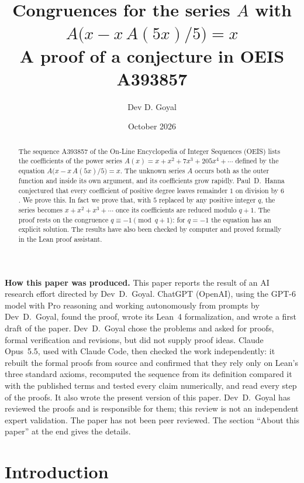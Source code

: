\documentclass[11pt,a4paper]{article}
\title{Congruences for the series $A$ with $A\bigl(x-x\,A(5x)/5\bigr)=x$\\[6pt]\large A proof of a conjecture in OEIS A393857}
\author{Dev D. Goyal}
\date{October 2026}
\theoremstyle{definition}
\theoremstyle{remark}
\begin{document}
\maketitle
\begin{abstract}
The sequence A393857 of the On-Line Encyclopedia of Integer Sequences (OEIS) lists the coefficients of the power
series $A(x)=x+x^2+7x^3+205x^4+\cdots$ defined by the equation
$A\bigl(x-x\,A(5x)/5\bigr)=x$. The unknown series $A$ occurs both as the outer function and inside its own argument, and its coefficients grow rapidly.
Paul~D.~Hanna conjectured that every coefficient of positive degree leaves remainder $1$ on division by $6$. We prove this. In fact we prove that, with $5$ replaced by any positive integer $q$, the series becomes $x+x^2+x^3+\cdots$ once its coefficients are reduced modulo $q+1$. The proof rests on the congruence $q\equiv-1\pmod{q+1}$: for $q=-1$ the equation
has an explicit solution. The results have also been checked by computer and proved formally in the
Lean proof assistant.
\end{abstract}
\begin{center}\begin{minipage}{0.88\linewidth}\small
\textbf{How this paper was produced.} This paper reports the result of an AI research effort directed by
Dev~D.~Goyal. ChatGPT (OpenAI), using the GPT-6 model with Pro reasoning and working autonomously from prompts by
Dev~D.~Goyal, found the proof, wrote its Lean~4 formalization, and wrote a first draft of the paper.
Dev~D.~Goyal chose the problems and asked for proofs, formal verification and revisions, but did not supply proof
ideas. Claude Opus~5.5, used with Claude Code, then checked the work independently: it rebuilt the formal proofs from
source and confirmed that they rely only on Lean's three standard axioms, recomputed the sequence from its definition
compared it with the published terms and tested every claim numerically, and read every step of the proofs. It also wrote the present
version of this paper.
Dev~D.~Goyal has reviewed the proofs and is responsible for them; this review is not an independent expert validation.
The paper has not been peer reviewed.
The section ``About this paper'' at the end gives the details.
\end{minipage}\end{center}

\section{Introduction}
\end{document}
